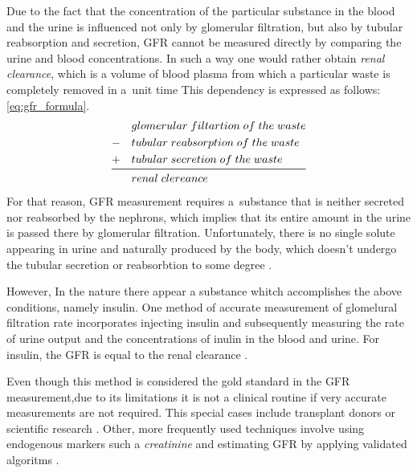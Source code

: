 Due to the fact that the concentration of the particular substance in the blood and the urine is influenced not only by glomerular filtration, but also by tubular reabsorption and secretion, GFR cannot be measured directly by comparing the urine and blood concentrations. In such a way one would rather obtain \textit{renal clearance}, which is a volume of blood plasma from which a particular waste is completely removed in a~unit time \cite{saladin} This dependency is expressed as follows: \ref{eq:gfr_formula}.
\begin{equation}
\begin{aligned}
&glomerular\;filtartion\;of\;the\;waste\\
-\quad&tubular\;reabsorption\;of\;the\;waste\\
+\quad&tubular\;secretion\;of\;the\;waste\\
\midrule
&renal\;clereance
\end{aligned}	
\label{eq:gfr_formula}
\end{equation}
For that reason, GFR measurement requires a~substance that is neither secreted nor reabsorbed by the nephrons, which implies that its entire amount in the urine is passed there by glomerular filtration. Unfortunately, there is no single solute appearing in urine and naturally produced by the body, which doesn't undergo the tubular secretion or reabsorbtion to some degree \cite{delanaye2012measuring}. 

However, In the nature there appear a substance whitch accomplishes the above conditions, namely insulin. One method of accurate measurement of glomelural filtration rate incorporates injecting insulin and subsequently measuring the rate of urine output and the concentrations of inulin in the blood and urine. For insulin, the GFR is equal to the renal clearance \cite{saladin, delanaye2012measuring}.


Even though this method is considered the gold standard in the GFR measurement,due to its limitations it is not a clinical routine if very accurate measurements are not required. This special cases include transplant donors or scientific research \cite{traynor2006measure}. 
Other, more frequently used techniques involve using endogenous markers such a \textit{creatinine} and estimating GFR by applying validated algoritms \cite{delanaye2012measuring}. 
 